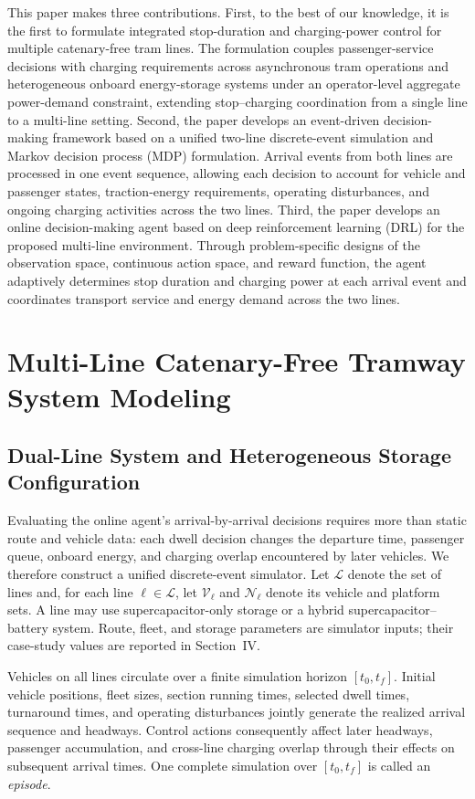 \documentclass[conference]{IEEEtran}
\begin{document}
This paper makes three contributions. First, to the best of our knowledge, it is the first to formulate integrated stop-duration and charging-power control for multiple catenary-free tram lines. The formulation couples passenger-service decisions with charging requirements across asynchronous tram operations and heterogeneous onboard energy-storage systems under an operator-level aggregate power-demand constraint, extending stop--charging coordination from a single line to a multi-line setting. Second, the paper develops an event-driven decision-making framework based on a unified two-line discrete-event simulation and Markov decision process (MDP) formulation. Arrival events from both lines are processed in one event sequence, allowing each decision to account for vehicle and passenger states, traction-energy requirements, operating disturbances, and ongoing charging activities across the two lines. Third, the paper develops an online decision-making agent based on deep reinforcement learning (DRL) for the proposed multi-line environment. Through problem-specific designs of the observation space, continuous action space, and reward function, the agent adaptively determines stop duration and charging power at each arrival event and coordinates transport service and energy demand across the two lines.

\section{Multi-Line Catenary-Free Tramway System Modeling}
\subsection{Dual-Line System and Heterogeneous Storage Configuration}
Evaluating the online agent's arrival-by-arrival decisions requires more than static route and vehicle data: each dwell decision changes the departure time, passenger queue, onboard energy, and charging overlap encountered by later vehicles. We therefore construct a unified discrete-event simulator. Let $\mathcal{L}$ denote the set of lines and, for each line $\ell\in\mathcal{L}$, let $\mathcal{V}_{\ell}$ and $\mathcal{N}_{\ell}$ denote its vehicle and platform sets. A line may use supercapacitor-only storage or a hybrid supercapacitor--battery system. Route, fleet, and storage parameters are simulator inputs; their case-study values are reported in Section~IV.

Vehicles on all lines circulate over a finite simulation horizon $[t_0,t_f]$. Initial vehicle positions, fleet sizes, section running times, selected dwell times, turnaround times, and operating disturbances jointly generate the realized arrival sequence and headways. Control actions consequently affect later headways, passenger accumulation, and cross-line charging overlap through their effects on subsequent arrival times. One complete simulation over $[t_0,t_f]$ is called an \emph{episode}.
\end{document}
